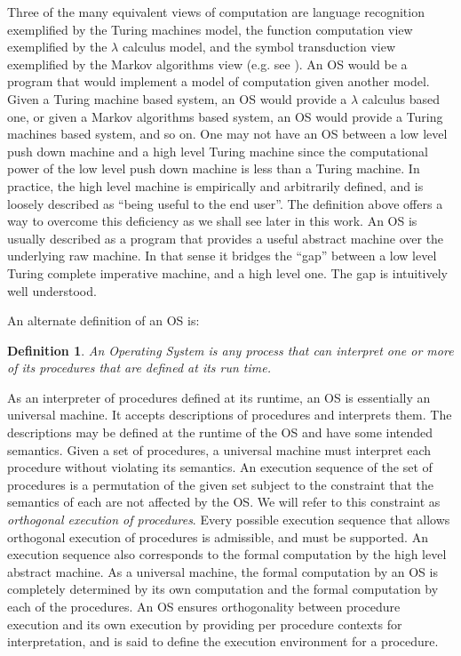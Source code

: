 \documentclass[draft]{article}
\newcounter{thedefn}
\newtheorem{mydefinition}[thedefn]{Definition}
\begin{document}
Three  of  the  many  equivalent  views of  computation  are  language
recognition  exemplified by  the Turing  machines model,  the function
computation view exemplified by  the $\lambda$ calculus model, and the
symbol  transduction view  exemplified by  the Markov  algorithms view
(e.g. see  \cite{Taylor:1998:MCF:275566}).  An  OS would be  a program
that  would implement  a  model of  computation  given another  model.
Given a Turing  machine based system, an OS  would provide a $\lambda$
calculus based one,  or given a Markov algorithms  based system, an OS
would provide a Turing machines based  system, and so on.  One may not
have an  OS between  a low level  push down  machine and a  high level
Turing machine  since the  computational power of  the low  level push
down machine  is less  than a Turing  machine.  In practice,  the high
level machine  is empirically and arbitrarily defined,  and is loosely
described as ``being  useful to the end user''.   The definition above
offers a way to overcome this deficiency as we shall see later in this
work.  An OS is usually described  as a program that provides a useful
abstract machine  over the underlying  raw machine.  In that  sense it
bridges  the ``gap'' between  a low  level Turing  complete imperative
machine,  and  a  high  level   one.   The  gap  is  intuitively  well
understood.

An alternate definition of an OS is:
\begin{mydefinition}
  {An} \emph{Operating  System} is any process that  can interpret one
  or more of its procedures that are defined at its run time.
  \label{def:os:constructive}
\end{mydefinition}

As  an interpreter  of procedures  defined at  its runtime,  an  OS is
essentially  an   universal  machine.   It   accepts  descriptions  of
procedures and  interprets them.  The  descriptions may be  defined at
the runtime of  the OS and have some intended  semantics.  Given a set
of  procedures,  a universal  machine  must  interpret each  procedure
without violating its semantics.  An  execution sequence of the set of
procedures is a permutation of the given set subject to the constraint
that the semantics of each are  not affected by the OS.  We will refer
to  this  constraint  as  \emph{orthogonal execution  of  procedures}.
Every possible execution sequence  that allows orthogonal execution of
procedures  is  admissible,  and  must  be  supported.   An  execution
sequence also corresponds to the  formal computation by the high level
abstract machine.   As a universal machine, the  formal computation by
an OS is  completely determined by its own  computation and the formal
computation by  each of the  procedures.  An OS  ensures orthogonality
between  procedure execution and  its own  execution by  providing per
procedure  contexts for  interpretation,  and is  said  to define  the
execution environment for a procedure.
\end{document}
